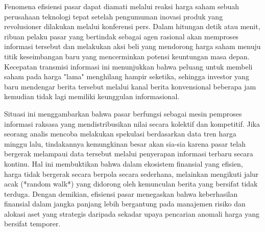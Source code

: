 \begin{example}
    Fenomena efisiensi pasar dapat diamati melalui reaksi harga saham sebuah perusahaan teknologi tepat setelah pengumuman inovasi produk yang revolusioner dilakukan melalui konferensi pers. Dalam hitungan detik atau menit, ribuan pelaku pasar yang bertindak sebagai agen rasional akan memproses informasi tersebut dan melakukan aksi beli yang mendorong harga saham menuju titik keseimbangan baru yang mencerminkan potensi keuntungan masa depan. Kecepatan transmisi informasi ini menunjukkan bahwa peluang untuk membeli saham pada harga "lama" menghilang hampir seketika, sehingga investor yang baru mendengar berita tersebut melalui kanal berita konvensional beberapa jam kemudian tidak lagi memiliki keunggulan informasional.

    Situasi ini menggambarkan bahwa pasar berfungsi sebagai mesin pemproses informasi raksasa yang mendistribusikan nilai secara kolektif dan kompetitif. Jika seorang analis mencoba melakukan spekulasi berdasarkan data tren harga minggu lalu, tindakannya kemungkinan besar akan sia-sia karena pasar telah bergerak melampaui data tersebut melalui penyerapan informasi terbaru secara kontinu. Hal ini membuktikan bahwa dalam ekosistem finansial yang efisien, harga tidak bergerak secara berpola secara sederhana, melainkan mengikuti jalur acak (*random walk*) yang didorong oleh kemunculan berita yang bersifat tidak terduga. Dengan demikian, efisiensi pasar menegaskan bahwa keberhasilan finansial dalam jangka panjang lebih bergantung pada manajemen risiko dan alokasi aset yang strategis daripada sekadar upaya pencarian anomali harga yang bersifat temporer.
\end{example}
